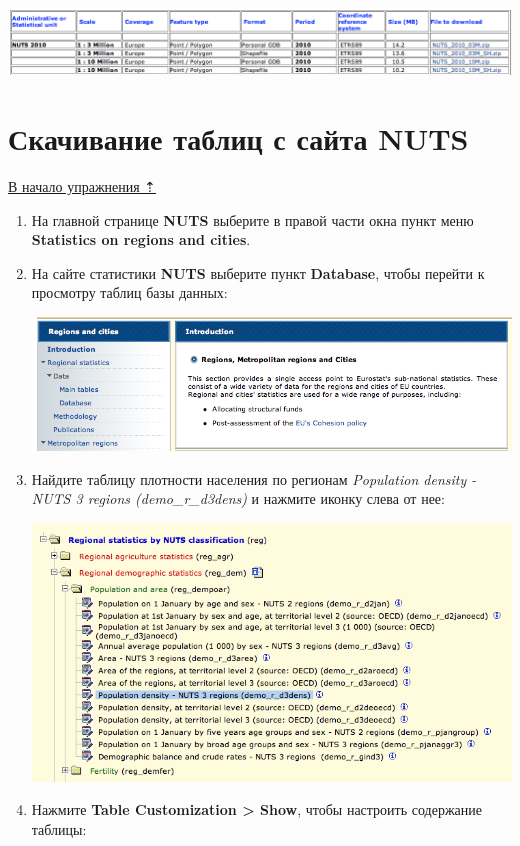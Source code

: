 \documentclass[12pt,]{book}
\begin{document}
\includegraphics{images/Ex08/image6.png}

\hypertarget{stat-map-economic-nuts-tables}{%
\section{Скачивание таблиц с сайта NUTS}\label{stat-map-economic-nuts-tables}}

\protect\hyperlink{stat-map-economic}{В начало упражнения ⇡}

\begin{enumerate}
\def\labelenumi{\arabic{enumi}.}
\item
  На главной странице \textbf{NUTS} выберите в правой части окна пункт меню \textbf{Statistics on regions and cities}.
\item
  На сайте статистики \textbf{NUTS} выберите пункт \textbf{Database}, чтобы перейти к просмотру таблиц базы данных:

  \includegraphics{images/Ex08/image7.png}
\item
  Найдите таблицу плотности населения по регионам \emph{Population density - NUTS 3 regions (demo\_r\_d3dens)} и нажмите иконку слева от нее:

  \includegraphics{images/Ex08/image8.png}
\item
  Нажмите \textbf{Table Customization \textgreater{} Show}, чтобы настроить содержание таблицы:


\end{enumerate}
\end{document}
